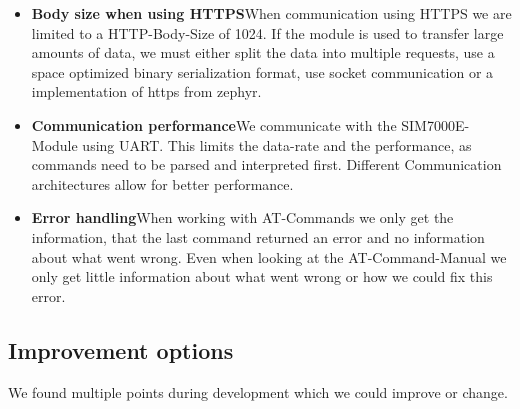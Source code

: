 \begin{itemize}
    \item \textbf{Body size when using HTTPS}\newline{}When communication using HTTPS we are limited to a HTTP-Body-Size of 1024. If the module is used to transfer large amounts of data, we must either split the data into multiple requests, use a space optimized binary serialization format, use socket communication or a implementation of https from zephyr.
    \item \textbf{Communication performance}\newline{}We communicate with the SIM7000E-Module using UART. This limits the data-rate and the performance, as commands need to be parsed and interpreted first. Different Communication architectures allow for better performance.
    \item \textbf{Error handling}\newline{}When working with AT-Commands we only get the information, that the last command returned an error and no information about what went wrong. Even when looking at the AT-Command-Manual we only get little information about what went wrong or how we could fix this error.
\end{itemize}

\subsection{Improvement options}

We found multiple points during development which we could improve or change.

